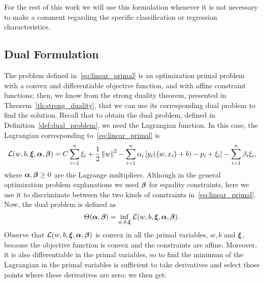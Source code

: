 %
For the rest of this work we will use this formulation whenever it is not necessary to make a comment regarding the specific classification or regression characteristics.

\subsection{Dual Formulation}
%
The problem defined in~\eqref{eq:linear_primal} is an optimization primal problem with a convex and differentiable objective function, and with affine constraint functions; then, we know from the strong duality theorem, presented in Theorem~\ref{th:strong_duality}, that we can use its corresponding dual problem to find the solution. Recall that to obtain the dual problem, defined in Definition~\ref{def:dual_problem}, we need the Lagrangian function. In this case, the Lagrangian corresponding to~\eqref{eq:linear_primal} is 
\begin{equation}
    \label{eq:linear_lagr}
    \lagr(w, b, \fv{\xi}, \fv{\alpha}, \fv{\beta}) = C \sum_{i=1}^\nsamples \xi_i + \frac{1}{2} \norm{w}^2 - \sum_{i=1}^\nsamples \alpha_i \left[ y_i (\dotp{w}{x_i} + b) - p_i + \xi_i \right] - \sum_{i=1}^\nsamples \beta_i \xi_i ,
\end{equation}
%
where $\bm{\alpha}, \bm{\beta} \geq 0$ are the Lagrange multipliers. Although in the general optimization problem explanations we used $\bm{\beta}$ for equality constraints, here we use it to discriminate between the two kinds of constraints in~\eqref{eq:linear_primal}. 
%
Now, the dual problem is defined as 
$$ \Theta(\bm{\alpha}, \bm{\beta}) = \inf_{w, b, \bm{\xi}} \mathcal{L}(w, b, \bm{\xi}, \bm{\alpha}, \bm{\beta}) . $$
Observe that $\mathcal{L}(w, b, \bm{\xi}, \bm{\alpha}, \bm{\beta})$ is convex in all the primal variables, $w, b$ and $\bm{\xi}$, because the objective function is convex and the constraints are affine. Moreover, it is also differentiable in the primal variables, so to find the minimum of the Lagrangian in the primal variables is sufficient to take derivatives and select those points where these derivatives are zero; we then get:
